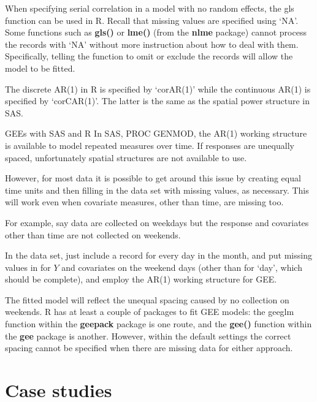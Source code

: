 \documentclass[
  9pt,
  ignorenonframetext,
]{beamer}
\begin{document}
\begin{frame}{}
\protect\hypertarget{section-5}{}
When specifying serial correlation in a model with no random effects,
the gls function can be used in R. Recall that missing values are
specified using `NA'. Some functions such as \textbf{gls()} or
\textbf{lme()} (from the \textbf{nlme} package) cannot process the
records with `NA' without more instruction about how to deal with them.
Specifically, telling the function to omit or exclude the records will
allow the model to be fitted.

The discrete AR(1) in R is specified by `corAR(1)' while the continuous
AR(1) is specified by `corCAR(1)'. The latter is the same as the spatial
power structure in SAS.
\end{frame}

\begin{frame}{GEEs with SAS and R}
\protect\hypertarget{gees-with-sas-and-r}{}
In SAS, PROC GENMOD, the AR(1) working structure is available to model
repeated measures over time. If responses are unequally spaced,
unfortunately spatial structures are not available to use.

However, for most data it is possible to get around this issue by
creating equal time units and then filling in the data set with missing
values, as necessary. This will work even when covariate measures, other
than time, are missing too.

For example, say data are collected on weekdays but the response and
covariates other than time are not collected on weekends.

In the data set, just include a record for every day in the month, and
put missing values in for \(Y\) and covariates on the weekend days
(other than for `day', which should be complete), and employ the AR(1)
working structure for GEE.

The fitted model will reflect the unequal spacing caused by no
collection on weekends. R has at least a couple of packages to fit GEE
models: the geeglm function within the \textbf{geepack} package is one
route, and the \textbf{gee()} function within the \textbf{gee} package
is another. However, within the default settings the correct spacing
cannot be specified when there are missing data for either approach.
\end{frame}

\hypertarget{case-studies}{%
\section{Case studies}\label{case-studies}}
\end{document}
